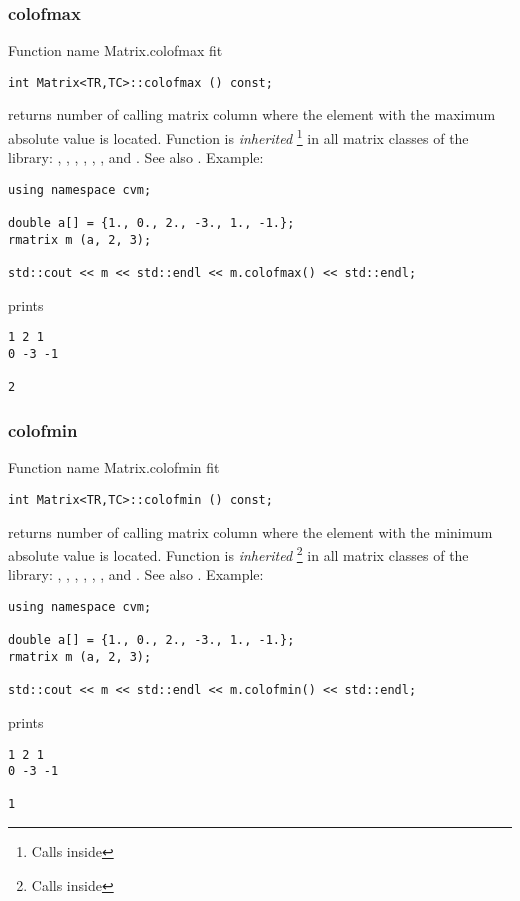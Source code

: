 \subsubsection{colofmax}
Function%
\pdfdest name {Matrix.colofmax} fit
\begin{verbatim}
int Matrix<TR,TC>::colofmax () const;
\end{verbatim}
returns  \Based number of calling matrix column 
where the element with the maximum absolute value is located.
Function is \emph{inherited}%
\footnote{Calls  inside}
in all matrix classes
of the library:
,   ,
, ,
, ,
 and .
See also .
Example:
\begin{Verbatim}
using namespace cvm;

double a[] = {1., 0., 2., -3., 1., -1.};
rmatrix m (a, 2, 3);

std::cout << m << std::endl << m.colofmax() << std::endl;
\end{Verbatim}
prints
\begin{Verbatim}
1 2 1
0 -3 -1

2
\end{Verbatim}
\newpage



\subsubsection{colofmin}
Function%
\pdfdest name {Matrix.colofmin} fit
\begin{verbatim}
int Matrix<TR,TC>::colofmin () const;
\end{verbatim}
returns  \Based number of  calling matrix column 
where the element with the minimum absolute value is located.
Function is \emph{inherited}%
\footnote{Calls  inside}
in all matrix classes
of the library:
,   ,
, ,
, ,
 and .
See also .
Example:
\begin{Verbatim}
using namespace cvm;

double a[] = {1., 0., 2., -3., 1., -1.};
rmatrix m (a, 2, 3);

std::cout << m << std::endl << m.colofmin() << std::endl;
\end{Verbatim}
prints
\begin{Verbatim}
1 2 1
0 -3 -1

1
\end{Verbatim}
\newpage




